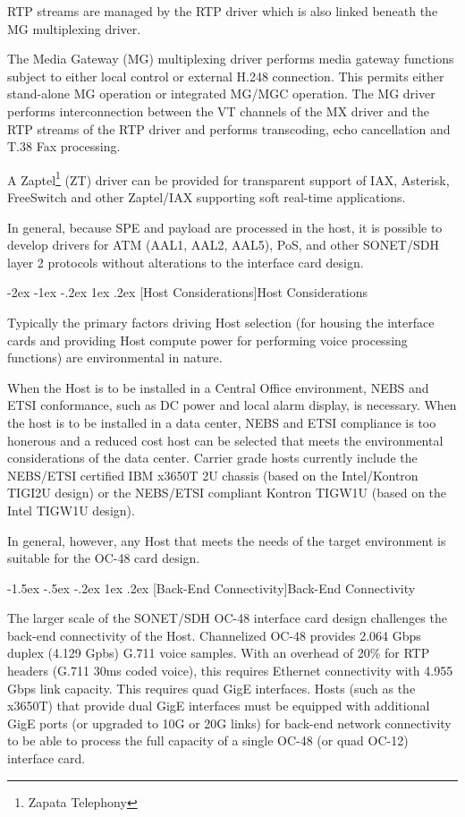 \documentclass[letterpaper,final,notitlepage,twocolumn,10pt,twoside]{article}
\makeatletter
\renewcommand\section{\@startsection {section}{1}{\z@}%
                                   {-2ex \@plus -1ex \@minus -.2ex}%
                                   {1ex \@plus .2ex}%
                                   {\normalfont\large\bfseries}}
\renewcommand\subsection{\@startsection{subsection}{2}{\z@}%
                                     {-1.5ex \@plus -.5ex \@minus -.2ex}%
                                     {1ex \@plus .2ex}%
                                     {\normalfont\normalsize\bfseries}}
\makeatother
\begin{document}
RTP streams are managed by the RTP driver which is also linked beneath the MG
multiplexing driver.

The Media Gateway (MG) multiplexing driver performs media gateway functions
subject to either local control or external H.248 connection.  This permits
either stand-alone MG operation or integrated MG/MGC operation.  The MG driver
performs interconnection between the VT channels of the MX driver and the RTP
streams of the RTP driver and performs transcoding, echo cancellation and T.38
Fax processing.

A Zaptel\footnote{Zapata Telephony} (ZT) driver can be provided for transparent
support of IAX, Asterisk, FreeSwitch and other Zaptel/IAX supporting soft
real-time applications.

In general, because SPE and payload are processed in the host, it is possible to
develop drivers for ATM (AAL1, AAL2, AAL5), PoS, and other SONET/SDH layer 2
protocols without alterations to the interface card design.

\section[Host Considerations]{Host Considerations}

Typically the primary factors driving Host selection (for housing the interface
cards and providing Host compute power for performing voice processing
functions) are environmental in nature.

When the Host is to be installed in a Central Office environment, NEBS and ETSI
conformance, such as DC power and local alarm display, is necessary.  When the
host is to be installed in a data center, NEBS and ETSI compliance is too
honerous and a reduced cost host can be selected that meets the environmental
considerations of the data center.  Carrier grade hosts currently include the
NEBS/ETSI certified IBM x3650T 2U chassis (based on the Intel/Kontron TIGI2U
design) or the NEBS/ETSI compliant Kontron TIGW1U (based on the Intel TIGW1U
design).

In general, however, any Host that meets the needs of the target environment is
suitable for the OC-48 card design.

\subsection[Back-End Connectivity]{Back-End Connectivity}

The larger scale of the SONET/SDH OC-48 interface card design challenges the
back-end connectivity of the Host.  Channelized OC-48 provides 2.064 Gbps duplex
(4.129 Gpbs) G.711 voice samples.  With an overhead of 20\% for RTP headers (G.711
30ms coded voice), this requires Ethernet connectivity with 4.955 Gbps link
capacity.  This requires quad GigE interfaces.  Hosts (such as the x3650T) that
provide dual GigE interfaces must be equipped with additional GigE ports (or
upgraded to 10G or 20G links) for back-end network connectivity to be able to
process the full capacity of a single OC-48 (or quad OC-12) interface card.
\end{document}
